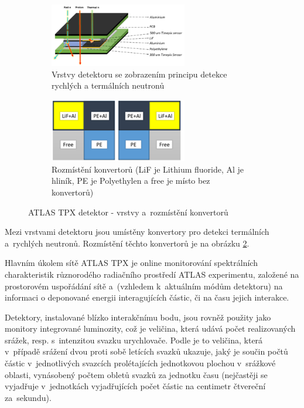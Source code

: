 \begin{figure}[th]
	\begin{center}
		\begin{subfigure}{6cm}
			\includegraphics[width=6cm]{figures/tpx_lay.png}	
			\caption{Vrstvy detektoru se zobrazením principu detekce rychlých a termálních neutronů}
			\label{fig:tpx_detector_layers}
		\end{subfigure}
		\hspace{0.5cm}
		\begin{subfigure}{6cm}
			\includegraphics[width=6cm]{figures/tpx_conv.png}
			\caption{Rozmístění konvertorů (LiF je Lithium fluoride, Al je hliník, PE je Polyethylen a free je místo bez konvertorů)}
			\label{fig:tpx_detector_convertors}
		\end{subfigure}
		\caption{ATLAS TPX detektor - vrstvy a~rozmístění konvertorů}
		\label{fig:tpx_detector}
	\end{center}			
\end{figure}

Mezi vrstvami detektoru jsou umístěny konvertory pro detekci termálních a~rychlých neutronů. Rozmístění těchto konvertorů je na obrázku \ref{fig:tpx_detector_convertors}.

Hlavním úkolem sítě ATLAS TPX je online monitorování spektrálních charakteristik různorodého radiačního prostředí ATLAS experimentu, založené na prostorovém uspořádání sítě a~(vzhledem k~aktuálním módům detektoru) na informaci o deponované energii interagujících částic, či na času jejich interakce. 

Detektory, instalované blízko interakčnímu bodu, jsou rovněž použity jako monitory integrované luminozity, což je veličina, která udává počet realizovaných srážek, resp. s~intenzitou svazku urychlovače. Podle \cite{wagner:o_lhc} je to veličina, která v~případě srážení dvou proti sobě letících svazků ukazuje, jaký je součin počtů částic v~jednotlivých svazcích prolétajících jednotkovou plochou v~srážkové oblasti, vynásobený počtem obletů svazků za jednotku času (nejčastěji se vyjadřuje v~jednotkách vyjadřujících počet částic na centimetr čtvereční za~sekundu).

